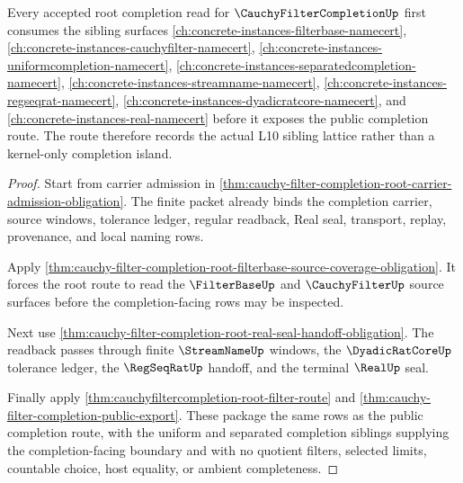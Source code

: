 \begin{theorem}
\label{thm:cauchy-filter-completion-root-sibling-dependency-route}
Every accepted root completion read for $\CauchyFilterCompletionUp$ first consumes the sibling surfaces \autoref{ch:concrete-instances-filterbase-namecert}, \autoref{ch:concrete-instances-cauchyfilter-namecert}, \autoref{ch:concrete-instances-uniformcompletion-namecert}, \autoref{ch:concrete-instances-separatedcompletion-namecert}, \autoref{ch:concrete-instances-streamname-namecert}, \autoref{ch:concrete-instances-regseqrat-namecert}, \autoref{ch:concrete-instances-dyadicratcore-namecert}, and \autoref{ch:concrete-instances-real-namecert} before it exposes the public completion route. The route therefore records the actual L10 sibling lattice rather than a kernel-only completion island.
\end{theorem}
\begin{proof}
Start from carrier admission in \autoref{thm:cauchy-filter-completion-root-carrier-admission-obligation}. The finite packet already binds the completion carrier, source windows, tolerance ledger, regular readback, Real seal, transport, replay, provenance, and local naming rows.

Apply \autoref{thm:cauchy-filter-completion-root-filterbase-source-coverage-obligation}. It forces the root route to read the $\FilterBaseUp$ and $\CauchyFilterUp$ source surfaces before the completion-facing rows may be inspected.

Next use \autoref{thm:cauchy-filter-completion-root-real-seal-handoff-obligation}. The readback passes through finite $\StreamNameUp$ windows, the $\DyadicRatCoreUp$ tolerance ledger, the $\RegSeqRatUp$ handoff, and the terminal $\RealUp$ seal.

Finally apply \autoref{thm:cauchyfiltercompletion-root-filter-route} and \autoref{thm:cauchy-filter-completion-public-export}. These package the same rows as the public completion route, with the uniform and separated completion siblings supplying the completion-facing boundary and with no quotient filters, selected limits, countable choice, host equality, or ambient completeness.
\end{proof}
